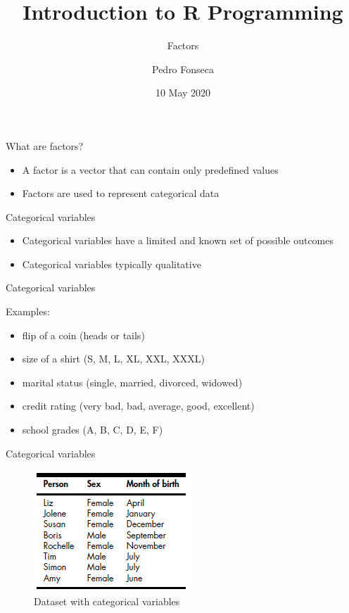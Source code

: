 \documentclass[ignorenonframetext,]{beamer}
\title{Introduction to R Programming}
\subtitle{Factors}
\author{Pedro Fonseca}
\date{10 May 2020}
\begin{document}
\frame{\titlepage}

\begin{frame}{What are factors?}
\protect\hypertarget{what-are-factors}{}

\begin{itemize}
\item
  A factor is a vector that can contain only predefined values
\item
  Factors are used to represent categorical data
\end{itemize}

\end{frame}

\begin{frame}{Categorical variables}
\protect\hypertarget{categorical-variables}{}

\begin{itemize}
\item
  Categorical variables have a limited and known set of possible
  outcomes
\item
  Categorical variables typically qualitative
\end{itemize}

\end{frame}

\begin{frame}{Categorical variables}
\protect\hypertarget{categorical-variables-1}{}

Examples:

\begin{itemize}
\item
  flip of a coin (heads or tails)
\item
  size of a shirt (S, M, L, XL, XXL, XXXL)
\item
  marital status (single, married, divorced, widowed)
\item
  credit rating (very bad, bad, average, good, excellent)
\item
  school grades (A, B, C, D, E, F)
\end{itemize}

\end{frame}

\begin{frame}{Categorical variables}
\protect\hypertarget{categorical-variables-2}{}

\begin{figure}
\centering
\includegraphics{figures/dataset.png}
\caption{Dataset with categorical variables}
\end{figure}

\end{frame}
\end{document}
